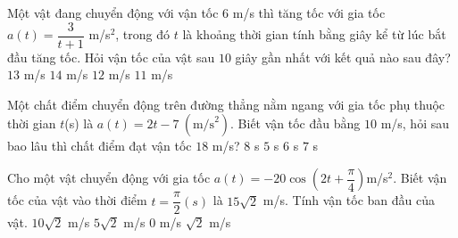 \begin{ex}%
	Một vật đang chuyển động với vận tốc $6$ m/s thì tăng tốc với gia tốc $a(t)=\dfrac{3}{t+1}$ m/s$^2$, trong đó $t$ là khoảng thời gian tính bằng giây kể từ lúc bắt đầu tăng tốc. Hỏi vận tốc của vật sau $10$ giây gần nhất với kết quả nào sau đây?
	\choice
	{\True $13$ m/s}
	{$14$ m/s}
	{$12$ m/s}
	{$11$ m/s}
\end{ex}

\begin{ex}
	Một chất điểm chuyển động trên đường thẳng nằm ngang với gia tốc phụ thuộc thời gian $t$(s) là $a(t)=2t-7\ \left(\mathrm{m/s}^2\right)$. Biết vận tốc đầu bằng $10$ m/s, hỏi sau bao lâu thì chất điểm đạt vận tốc $18$ m/s?
	\choice
	{\True $8$ s}
	{$5$ s}
	{$6$ s}
	{$7$ s}
\end{ex}

\begin{ex}
	Cho một vật chuyển động với gia tốc $a(t)=-20\cos \left(2t+\dfrac{\pi}{4}\right)$m/s$^2$. Biết vận tốc của vật vào thời điểm $t=\dfrac{\pi}{2}(s)$ là $15\sqrt{2}$ m/s. Tính vận tốc ban đầu của vật.
	\choice
	{$10\sqrt{2}$ m/s}
	{\True $5\sqrt{2}$ m/s}
	{$0$ m/s}
	{$\sqrt{2}$ m/s}
\end{ex}

